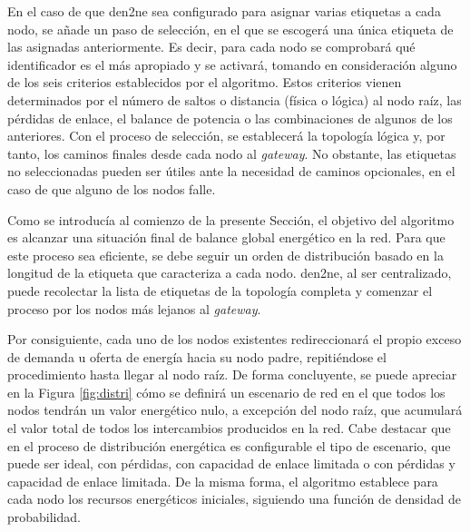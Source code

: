 \vspace{3mm}

En el caso de que \gls{den2ne} sea configurado para asignar varias etiquetas a cada nodo, se añade un paso de selección, en el que se escogerá una única etiqueta de las asignadas anteriormente. Es decir, para cada nodo se comprobará qué identificador es el más apropiado y se activará, tomando en consideración alguno de los seis criterios establecidos por el algoritmo. Estos criterios vienen determinados por el número de saltos o distancia (física o lógica) al nodo raíz, las pérdidas de enlace, el balance de potencia o las combinaciones de algunos de los anteriores. Con el proceso de selección, se establecerá la topología lógica y, por tanto, los caminos finales desde cada nodo al \textit{gateway}. No obstante, las etiquetas no seleccionadas pueden ser útiles ante la necesidad de caminos opcionales, en el caso de que alguno de los nodos falle.

\vspace{3mm}

Como se introducía al comienzo de la presente Sección, el objetivo del algoritmo es alcanzar una situación final de balance global energético en la red. Para que este proceso sea eficiente, se debe seguir un orden de distribución basado en la longitud de la etiqueta que caracteriza a cada nodo. \gls{den2ne}, al ser centralizado, puede recolectar la lista de etiquetas de la topología completa y comenzar el proceso por los nodos más lejanos al \textit{gateway}. 

\vspace{3mm}

Por consiguiente, cada uno de los nodos existentes redireccionará el propio exceso de demanda u oferta de energía hacia su nodo padre, repitiéndose el procedimiento hasta llegar al nodo raíz. De forma concluyente, se puede apreciar en la Figura \ref{fig:distri} cómo se definirá un escenario de red en el que todos los nodos tendrán un valor energético nulo, a excepción del nodo raíz, que acumulará el valor total de todos los intercambios producidos en la red. Cabe destacar que en el proceso de distribución energética es configurable el tipo de escenario, que puede ser ideal, con pérdidas, con capacidad de enlace limitada o con pérdidas y capacidad de enlace limitada. De la misma forma, el algoritmo establece para cada nodo los recursos energéticos iniciales, siguiendo una función de densidad de probabilidad.

\vspace{3mm}

